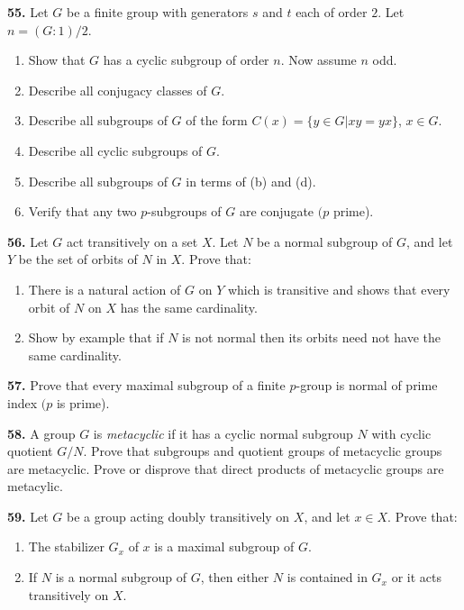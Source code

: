 \documentclass[a4paper,11pt,final,openany]{memoir}%
\theoremstyle{nonumberplain}
\begin{document}
\medskip\noindent\textbf{55.} Let $G$ be a finite group with generators $s$
and $t$ each of order $2$. Let $n=(G:1)/2$.

\begin{enumerate}
\item Show that $G$ has a cyclic subgroup of order $n$. Now assume $n$ odd.

\item Describe all conjugacy classes of $G$.

\item Describe all subgroups of $G$ of the form $C(x)=\{y\in G|xy=yx\}$, $x\in
G$.

\item Describe all cyclic subgroups of $G$.

\item Describe all subgroups of $G$ in terms of (b) and (d).

\item Verify that any two $p$-subgroups of $G$ are conjugate $(p$ prime).
\end{enumerate}

\medskip\noindent\textbf{56.} Let $G$ act transitively on a set $X$. Let $N$
be a normal subgroup of $G$, and let $Y$ be the set of orbits of $N$ in $X$.
Prove that:

\begin{enumerate}
\item There is a natural action of $G$ on $Y$ which is transitive and shows
that every orbit of $N$ on $X$ has the same cardinality.

\item Show by example that if $N$ is not normal then its orbits need not have
the same cardinality.
\end{enumerate}

\medskip\noindent\textbf{57.} Prove that every maximal subgroup of a finite
$p$-group is normal of prime index $(p$ is prime).

\medskip\noindent\textbf{58.} A group $G$ is \textit{metacyclic\/}%
if it has a cyclic normal subgroup $N$ with cyclic quotient $G/N$. Prove that
subgroups and quotient groups of metacyclic groups are metacyclic. Prove or
disprove that direct products of metacyclic groups are metacylic.

\medskip\noindent\textbf{59.} Let $G$ be a group acting doubly transitively on
$X$, and let $x\in X$. Prove that:

\begin{enumerate}
\item The stabilizer $G_{x}$ of $x$ is a maximal subgroup of $G$.

\item If $N$ is a normal subgroup of $G$, then either $N$ is contained in
$G_{x}$ or it acts transitively on $X$.
\end{enumerate}
\end{document}
